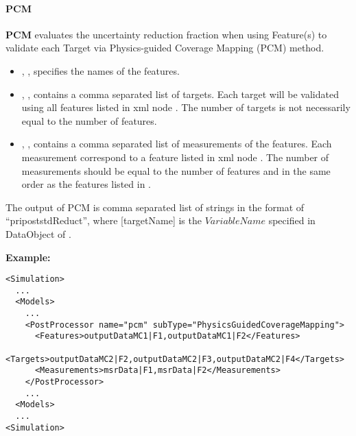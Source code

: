 \paragraph{PCM}
\textbf{PCM} evaluates the uncertainty reduction fraction when using Feature(s) to validate each Target via Physics-guided Coverage Mapping (PCM) method.

%
%

\begin{itemize}
  \item {}, , specifies the names of the features.
  \item {}, , contains a comma separated list of
     targets. \nb Each target will be validated using all features listed in xml node . The
    number of targets is not necessarily equal to the number of features.
  \item {}, , contains a comma separated list of
     measurements of the features. \nb Each measurement correspond to a feature listed in xml node . The
    number of measurements should be equal to the number of features and in the same order as the features listed in .
\end{itemize}

The output of PCM is comma separated list of strings in the format of ``pri\textunderscore post\textunderscore stdReduct\textunderscore [targetName]'', 
where [targetName] is the $VariableName$ specified in DataObject of .


\textbf{Example:}
\begin{lstlisting}[style=XML,morekeywords={subType}]
<Simulation>
  ...
  <Models>
    ...
    <PostProcessor name="pcm" subType="PhysicsGuidedCoverageMapping">
      <Features>outputDataMC1|F1,outputDataMC1|F2</Features>
      <Targets>outputDataMC2|F2,outputDataMC2|F3,outputDataMC2|F4</Targets>
      <Measurements>msrData|F1,msrData|F2</Measurements>
    </PostProcessor>
    ...
  <Models>
  ...
<Simulation>
\end{lstlisting}
